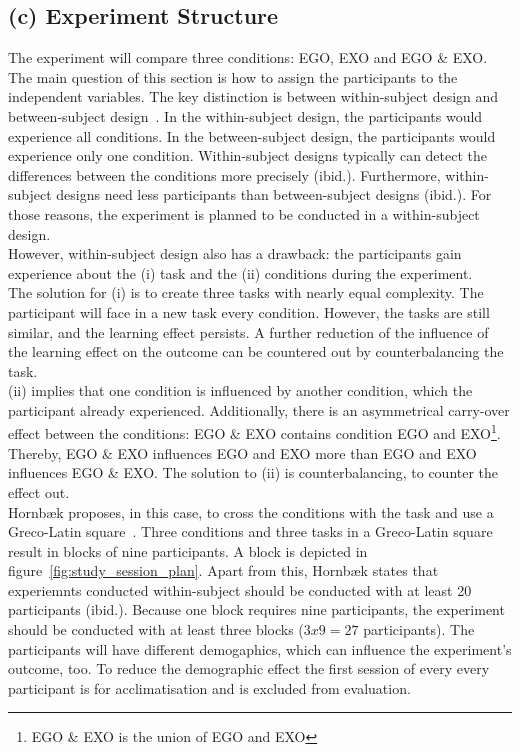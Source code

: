 \subsection{(c) Experiment Structure}
\label{sec:studyStructure}
The experiment will compare three conditions: EGO, EXO and EGO \& EXO. The main question of this section is how to assign the participants to the independent variables. The key distinction is between within-subject design and between-subject design~\cite{hornbaek}. In the within-subject design, the participants would experience all conditions. In the between-subject design, the participants would experience only one condition. Within-subject designs typically can detect the differences between the conditions more precisely (ibid.). Furthermore, within-subject designs need less participants than between-subject designs (ibid.). For those reasons, the experiment is planned to be conducted in a within-subject design.\\
However, within-subject design also has a drawback: the participants gain experience about the (i) task and the (ii) conditions during the experiment.\\

The solution for (i) is to create three tasks with nearly equal complexity. The participant will face in a new task every condition. However, the tasks are still similar, and the learning effect persists. A further reduction of the influence of the learning effect on the outcome can be countered out by counterbalancing the task.\\

(ii) implies that one condition is influenced by another condition, which the participant already experienced. Additionally, there is an asymmetrical carry-over effect between the conditions: EGO \& EXO contains condition EGO and EXO\footnote{EGO \& EXO is the union of EGO and EXO}. Thereby, EGO \& EXO influences EGO and EXO more than EGO and EXO influences EGO \& EXO. The solution to (ii) is counterbalancing, to counter the effect out.\\

Hornb\ae{}k proposes, in this case, to cross the conditions with the task and use a Greco-Latin square~\cite{hornbaek}. Three conditions and three tasks in a Greco-Latin square result in blocks of nine participants. A block is depicted in figure~\ref{fig:study_session_plan}. Apart from this, Hornb\ae{}k states that experiemnts conducted within-subject should be conducted with at least 20 participants (ibid.). Because one block requires nine participants, the experiment should be conducted with at least three blocks ($3x9=27$ participants). 
The participants will have different demogaphics, which can influence the experiment's outcome, too. To reduce the demographic effect the first session of every every participant is for acclimatisation and is excluded from evaluation.

